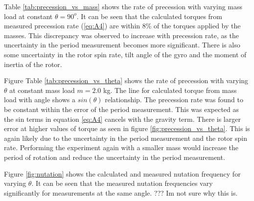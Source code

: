\documentclass[8pt]{article}
\begin{document}
Table \ref{tab:precession_vs_mass} shows the rate of precession with varying mass load at constant $\theta = 90^o$.
It can be seen that the calculated torques from measured precession rate (\ref{eq:A4}) are within 8\% of the torques applied by the masses.
This discrepancy was observed to increase with precession rate, as the uncertainty in the period measurement becomes more significant.
There is also some uncertainty in the rotor spin rate, tilt angle of the gyro and the moment of inertia of the rotor.


Figure Table \ref{tab:precession_vs_theta} shows the rate of precession with varying $\theta$ at constant mass load $m = 2.0$ kg.
The line for calculated torque from mass load with angle shows a $sin(\theta)$ relationship.
The precession rate was found to be constant within the error of the period measurement.
This was expected as the sin terms in equation \ref{eq:A4} cancels with the gravity term.
There is larger error at higher values of torque as seen in figure \ref{fig:precession_vs_theta}.
This is again likely due to the uncertainty in the period measurement and the rotor spin rate.
Performing the experiment again with a smaller mass would increase the period of rotation and reduce the uncertainty in the period measurement.



Figure \ref{fig:nutation} shows the calculated and measured nutation frequency for varying $\theta$.
It can be seen that the measured nutation frequencies vary significantly for measurements at the same angle.
??? Im not sure why this is.


\end{document}

